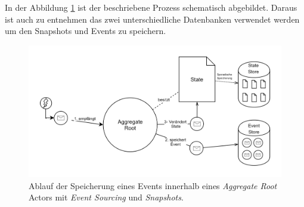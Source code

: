 In der Abbildung \ref{fig:implementation:eventSourcingAggregateRoot} ist der beschriebene Prozess schematisch abgebildet. Daraus ist auch zu entnehmen das zwei unterschiedliche Datenbanken verwendet werden um den Snapshots und Events zu speichern.
\begin{figure}
    \centering
    \includegraphics[width=\linewidth]{gfx/implementation/EventSourcingAkka}
    \caption{Ablauf der Speicherung eines Events innerhalb eines \textit{Aggregate Root} Actors mit \textit{Event Sourcing} und \textit{Snapshots}.}
    \label{fig:implementation:eventSourcingAggregateRoot}
\end{figure} 

